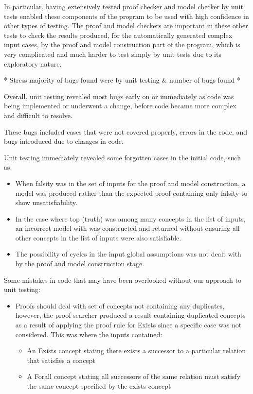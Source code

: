 In particular, having extensively tested proof checker and model checker by unit tests enabled these components of the program to be used with high confidence in other types of testing. The proof and model checkers are important in these other tests to check the results produced, for the automatically generated complex input cases, by the proof and model construction part of the program, which is very complicated and much harder to test simply by unit tests due to its exploratory nature.

* Stress majority of bugs found were by unit testing \& number of bugs found *

Overall, unit testing revealed most bugs early on or immediately as code was being implemented or underwent a change, before code became more complex and difficult to resolve. 

These bugs included cases that were not covered properly, errors in the code, and bugs introduced due to changes in code.

Unit testing immediately revealed some forgotten cases in the initial code, such as:

\begin{itemize}
\item When falsity was in the set of inputs for the proof and model construction, a model was produced rather than the expected proof containing only falsity to show unsatisfiability.
\item In the case where top (truth) was among many concepts in the list of inputs, an incorrect model with was constructed and returned without ensuring all other concepts in the list of inputs were also satisfiable.
\item The possibility of cycles in the input global assumptions was not dealt with by the proof and model construction stage.
\end{itemize}

Some mistakes in code that may have been overlooked without our approach to unit testing:

\begin{itemize}
\item Proofs should deal with set of concepts not containing any duplicates, however, the proof searcher produced a result containing duplicated concepts as a result of applying the proof rule for Exists since a specific case was not considered. This was where the inputs contained:
\begin{itemize}
\item An Exists concept stating there exists a successor to a particular relation that satisfies a concept
\item A Forall concept stating all successors of the same relation must satisfy the same concept specified by the exists concept
\end{itemize}
\end{itemize}


